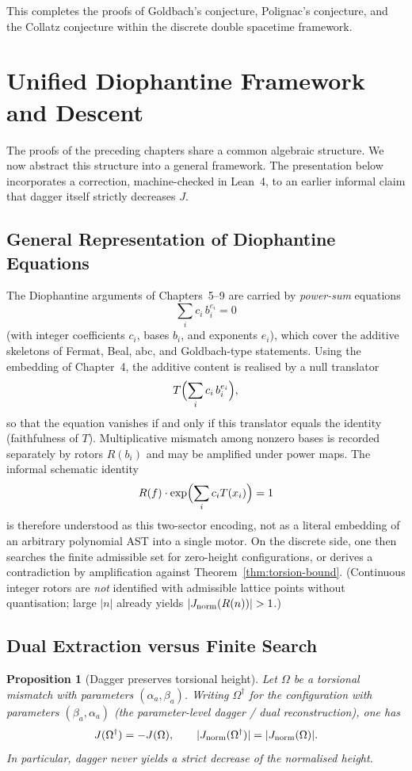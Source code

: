 \documentclass[dvipdfmx,a4paper]{article}
\newtheorem{proposition}[theorem]{Proposition}
\theoremstyle{definition}
\theoremstyle{remark}
\newcommand{\Jnorm}{J_{\rm norm}}
\begin{document}
This completes the proofs of Goldbach’s conjecture, Polignac’s conjecture, and the Collatz conjecture within the discrete double spacetime framework.

\section{Unified Diophantine Framework and Descent}

The proofs of the preceding chapters share a common algebraic structure. We now abstract this structure into a general framework. The presentation below incorporates a correction, machine-checked in Lean~4, to an earlier informal claim that dagger itself strictly decreases \(J\).

\subsection{General Representation of Diophantine Equations}

The Diophantine arguments of Chapters~5--9 are carried by \emph{power-sum} equations
\[
\sum_i c_i\, b_i^{e_i}=0
\]
(with integer coefficients \(c_i\), bases \(b_i\), and exponents \(e_i\)), which cover the additive skeletons of Fermat, Beal, abc, and Goldbach-type statements. Using the embedding of Chapter~4, the additive content is realised by a null translator
\[
T\Bigl(\sum_i c_i\, b_i^{e_i}\Bigr),
\]
so that the equation vanishes if and only if this translator equals the identity (faithfulness of \(T\)). Multiplicative mismatch among nonzero bases is recorded separately by rotors \(R(b_i)\) and may be amplified under power maps. The informal schematic identity
\[
R(f) \cdot \exp\Bigl( \sum_i c_i T(x_i) \Bigr) = 1
\]
is therefore understood as this two-sector encoding, not as a literal embedding of an arbitrary polynomial AST into a single motor. On the discrete side, one then searches the finite admissible set for zero-height configurations, or derives a contradiction by amplification against Theorem~\ref{thm:torsion-bound}. (Continuous integer rotors are \emph{not} identified with admissible lattice points without quantisation; large \(|n|\) already yields \(|\Jnorm(R(n))|>1\).)

\subsection{Dual Extraction versus Finite Search}
\label{sec:unified-descent}

\begin{proposition}[Dagger preserves torsional height]
\label{prop:dagger-height}
Let \(\Omega\) be a torsional mismatch with parameters \((\alpha_a,\beta_a)\). Writing \(\Omega^\dagger\) for the configuration with parameters \((\beta_a,\alpha_a)\) (the parameter-level dagger / dual reconstruction), one has
\[
J(\Omega^\dagger)=-J(\Omega),\qquad |\Jnorm(\Omega^\dagger)|=|\Jnorm(\Omega)|.
\]
In particular, dagger never yields a strict decrease of the normalised height.
\end{proposition}
\end{document}
